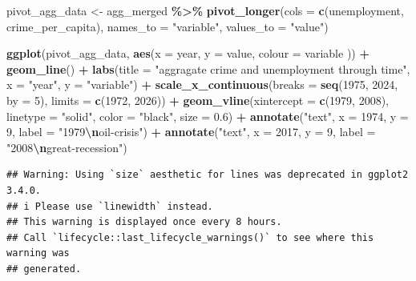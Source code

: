 \documentclass[
]{article}
\newenvironment{Shaded}{\begin{snugshade}}{\end{snugshade}}
\newcommand{\AttributeTok}[1]{\textcolor[rgb]{0.13,0.29,0.53}{#1}}
\newcommand{\DecValTok}[1]{\textcolor[rgb]{0.00,0.00,0.81}{#1}}
\newcommand{\FloatTok}[1]{\textcolor[rgb]{0.00,0.00,0.81}{#1}}
\newcommand{\FunctionTok}[1]{\textcolor[rgb]{0.13,0.29,0.53}{\textbf{#1}}}
\newcommand{\NormalTok}[1]{#1}
\newcommand{\OtherTok}[1]{\textcolor[rgb]{0.56,0.35,0.01}{#1}}
\newcommand{\SpecialCharTok}[1]{\textcolor[rgb]{0.81,0.36,0.00}{\textbf{#1}}}
\newcommand{\StringTok}[1]{\textcolor[rgb]{0.31,0.60,0.02}{#1}}
\begin{document}
\begin{Shaded}
\begin{Highlighting}[]
\NormalTok{pivot\_agg\_data }\OtherTok{\textless{}{-}}\NormalTok{ agg\_merged }\SpecialCharTok{\%\textgreater{}\%}
  \FunctionTok{pivot\_longer}\NormalTok{(}\AttributeTok{cols =} \FunctionTok{c}\NormalTok{(unemployment, crime\_per\_capita), }\AttributeTok{names\_to =} \StringTok{"variable"}\NormalTok{, }\AttributeTok{values\_to =} \StringTok{"value"}\NormalTok{)}

\FunctionTok{ggplot}\NormalTok{(pivot\_agg\_data, }\FunctionTok{aes}\NormalTok{(}\AttributeTok{x =}\NormalTok{ year, }\AttributeTok{y =}\NormalTok{ value, }\AttributeTok{colour =}\NormalTok{ variable )) }\SpecialCharTok{+}
  \FunctionTok{geom\_line}\NormalTok{() }\SpecialCharTok{+}
  \FunctionTok{labs}\NormalTok{(}\AttributeTok{title =} \StringTok{"aggragate crime and unemployment through time"}\NormalTok{, }\AttributeTok{x =} \StringTok{"year"}\NormalTok{, }\AttributeTok{y =} \StringTok{"variable"}\NormalTok{) }\SpecialCharTok{+}
  \FunctionTok{scale\_x\_continuous}\NormalTok{(}\AttributeTok{breaks =} \FunctionTok{seq}\NormalTok{(}\DecValTok{1975}\NormalTok{, }\DecValTok{2024}\NormalTok{, }\AttributeTok{by =} \DecValTok{5}\NormalTok{), }\AttributeTok{limits =} \FunctionTok{c}\NormalTok{(}\DecValTok{1972}\NormalTok{, }\DecValTok{2026}\NormalTok{)) }\SpecialCharTok{+}
  \FunctionTok{geom\_vline}\NormalTok{(}\AttributeTok{xintercept =} \FunctionTok{c}\NormalTok{(}\DecValTok{1979}\NormalTok{, }\DecValTok{2008}\NormalTok{), }
             \AttributeTok{linetype =} \StringTok{"solid"}\NormalTok{, }
             \AttributeTok{color =} \StringTok{"black"}\NormalTok{, }
             \AttributeTok{size =} \FloatTok{0.6}\NormalTok{) }\SpecialCharTok{+} 
  \FunctionTok{annotate}\NormalTok{(}\StringTok{"text"}\NormalTok{, }\AttributeTok{x =} \DecValTok{1974}\NormalTok{, }\AttributeTok{y =} \DecValTok{9}\NormalTok{, }\AttributeTok{label =} \StringTok{"1979}\SpecialCharTok{\textbackslash{}n}\StringTok{oil{-}crisis"}\NormalTok{) }\SpecialCharTok{+}
  \FunctionTok{annotate}\NormalTok{(}\StringTok{"text"}\NormalTok{, }\AttributeTok{x =} \DecValTok{2017}\NormalTok{, }\AttributeTok{y =} \DecValTok{9}\NormalTok{, }\AttributeTok{label =} \StringTok{"2008}\SpecialCharTok{\textbackslash{}n}\StringTok{great{-}recession"}\NormalTok{)}
\end{Highlighting}
\end{Shaded}

\begin{verbatim}
## Warning: Using `size` aesthetic for lines was deprecated in ggplot2 3.4.0.
## i Please use `linewidth` instead.
## This warning is displayed once every 8 hours.
## Call `lifecycle::last_lifecycle_warnings()` to see where this warning was
## generated.
\end{verbatim}
\end{document}
